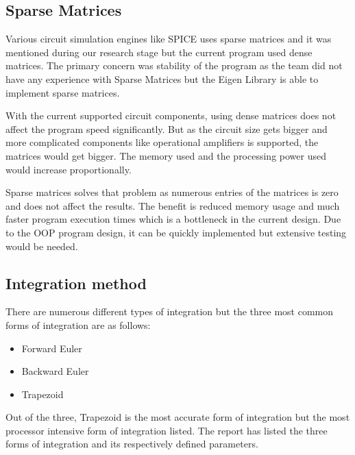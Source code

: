 \documentclass[12pt,a4paper]{article}
\begin{document}
\subsection{Sparse Matrices}
Various circuit simulation engines like SPICE uses sparse matrices and it was mentioned \cite{OOP} during our research stage but 
the current program used dense matrices. The primary concern was stability of the program as the team did not have 
any experience with Sparse Matrices but the Eigen Library is able to implement sparse matrices. \par
With the current supported circuit components, using dense matrices does not affect the program speed significantly. But as 
the circuit size gets bigger and more complicated components like operational amplifiers is supported, the matrices would
get bigger. The memory used and the processing power used would increase proportionally. \par
Sparse matrices solves that problem as numerous entries of the matrices is zero and does not affect the results. The benefit is
reduced memory usage and much faster program execution times which is a bottleneck in the current design.
Due to the OOP program design, it can be quickly implemented but extensive testing would be needed.
\subsection{Integration method}
There are numerous different types of integration but the three most common forms of integration are as follows:
\begin{itemize}
	\item Forward Euler
	\item Backward Euler
	\item Trapezoid
\end{itemize}
Out of the three, Trapezoid is the most accurate form of integration but the most processor intensive form of integration listed.
The report has listed the three forms of integration and its respectively defined parameters. 
\end{document}
